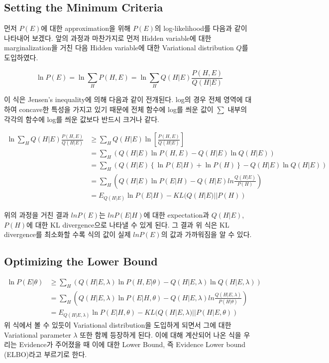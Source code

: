 \documentclass[draft=false]{oblivoir}
\begin{document}
\subsection{Setting the Minimum Criteria}
먼저 $P(E)$에 대한 approximation을 위해 $P(E)$의 log-likelihood를 다음과 같이 나타내어 보겠다. 앞의 과정과 마찬가지로 먼저 Hidden variable에 대한 marginalization을 거친 다음 Hidden variable에 대한 Variational distribution $Q$를 도입하였다. 

\begin{equation}
\ln P(E) = \ln \sum_{H}P(H,E)= \ln \sum_{H}Q(H|E)\frac{P(H,E)}{Q(H|E)}
\label{eq:11-2-13}
\end{equation}

이 식은 Jensen's inequality에 의해 다음과 같이 전개된다. log의 경우 전체 영역에 대하여 concave한 특성을 가지고 있기 때문에 전체 함수에 log를 씌운 값이 $\sum$ 내부의 각각의 함수에 log를 씌운 값보다 반드시 크거나 같다. 

\begin{align}
\ln \sum_{H} Q(H|E) \frac{P(H,E)}{Q(H|E)} &  \geq \sum_{H} Q(H|E) \ln \left[ \frac{P(H,E)}{Q(H|E)} \right]\nonumber\\
& = \sum_{H} \left( Q(H|E) \ln P(H,E) - Q(H|E) \ln Q(H|E)\right)\nonumber\\
& = \sum_{H} \left( Q(H|E)\left\{ \ln P(E|H) + \ln P(H)\right\} - Q(H|E)\ln Q(H|E)\right)\nonumber\\
& = \sum_{H} \left( Q(H|E)\ln P(E|H) - Q(H|E) ln\frac{ Q(H|E)}{ P(H)}\right)\nonumber\\
& = E_{Q(H|E)}\ln P(E|H) -KL(Q(H|E)|| P(H))
\label{eq:Q()11-2-5-10}
\end{align}

위의 과정을 거친 결과 $lnP(E)$는 $lnP(E|H)$에 대한 expectation과 $Q(H|E)$, $P(H)$에 대한 KL divergence으로 나타낼 수 있게 된다. 그 결과 위 식은 KL divergence를 최소화할 수록 식의 값이 실제 $lnP(E)$의 값과 가까워짐을 알 수 있다. 

\subsection{Optimizing the Lower Bound}
\begin{align}
\ln P(E|\theta) & \geq \sum_{H} \left( Q(H|E,\lambda) \ln P(H,E|\theta) - Q(H|E,\lambda) \ln Q(H|E,\lambda)\right)\nonumber\\
& = \sum_{H} \left( Q(H|E,\lambda)\ln P(E|H,\theta) - Q(H|E,\lambda) ln\frac{ Q(H|E,\lambda)}{ P(H|\theta)}\right)\nonumber\\
& = E_{Q(H|E,\lambda)}\ln P(E|H,\theta) -KL(Q(H|E,\lambda)|| P(H|E,\theta)) 
\end{align}
위 식에서 볼 수 있듯이 Variational distribution을 도입하게 되면서 그에 대한 Variational parameter $\lambda$ 또한 함께 등장하게 된다. 이에 대해 계산되어 나온 식을 우리는 Evidence가 주어졌을 때 이에 대한 Lower Bound, 즉 Evidence Lower bound (ELBO)라고 부르기로 한다. 
\end{document}
